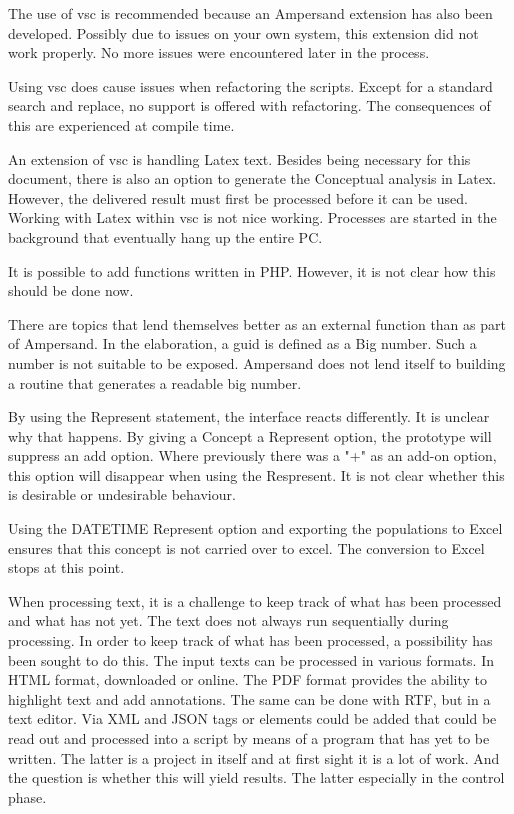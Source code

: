 The use of \acrfull{vsc} is recommended because an Ampersand extension has also been developed.
Possibly due to issues on your own system, this extension did not work properly.
No more issues were encountered later in the process.

Using \acrshort{vsc} does cause issues when refactoring the scripts.
Except for a standard search and replace, no support is offered with refactoring.
The consequences of this are experienced at compile time.

An extension of \acrshort{vsc} is handling Latex text.
Besides being necessary for this document, there is also an option to generate the Conceptual analysis in Latex.
However, the delivered result must first be processed before it can be used.
Working with Latex within \acrshort{vsc} is not nice working.
Processes are started in the background that eventually hang up the entire PC.

It is possible to add functions written in PHP.
However, it is not clear how this should be done now.

There are topics that lend themselves better as an external function than as part of Ampersand.
In the elaboration, a guid is defined as a Big number.
Such a number is not suitable to be exposed.
Ampersand does not lend itself to building a routine that generates a readable big number.

By using the Represent statement, the interface reacts differently.
It is unclear why that happens.
By giving a Concept a Represent option, the prototype will suppress an add option.
Where previously there was a "+" as an add-on option, this option will disappear when using the Respresent.
It is not clear whether this is desirable or undesirable behaviour.

Using the DATETIME Represent option and exporting the populations to Excel ensures that this concept is not carried over to excel.
The conversion to Excel stops at this point.

When processing text, it is a challenge to keep track of what has been processed and what has not yet.
The text does not always run sequentially during processing.
In order to keep track of what has been processed, a possibility has been sought to do this.
The input texts can be processed in various formats.
In HTML format, downloaded or online.
The PDF format provides the ability to highlight text and add annotations.
The same can be done with RTF, but in a text editor.
Via XML and JSON tags or elements could be added that could be read out and processed into a script by means of a program that has yet to be written.
The latter is a project in itself and at first sight it is a lot of work.
And the question is whether this will yield results.
The latter especially in the control phase.

